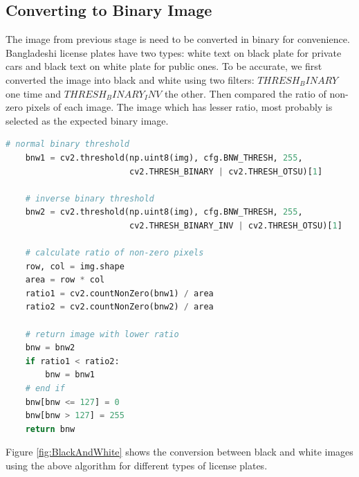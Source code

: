 \documentclass{standalone}
\begin{document}
\subsection{Converting to Binary Image}
The image from previous stage is need to be converted in binary for convenience. Bangladeshi license plates have two types: white text on black plate for private cars and black text on white plate for public ones. To be accurate, we first converted the image into black and white using two filters: $THRESH_BINARY$ one time and $THRESH_BINARY_INV$ the other. Then compared the ratio of non-zero pixels of each image. The image which has lesser ratio, most probably is selected as the expected binary image. 
\begin{lstlisting}[language=Python]
    # normal binary threshold
    bnw1 = cv2.threshold(np.uint8(img), cfg.BNW_THRESH, 255,
                         cv2.THRESH_BINARY | cv2.THRESH_OTSU)[1]

    # inverse binary threshold
    bnw2 = cv2.threshold(np.uint8(img), cfg.BNW_THRESH, 255,
                         cv2.THRESH_BINARY_INV | cv2.THRESH_OTSU)[1]

    # calculate ratio of non-zero pixels
    row, col = img.shape
    area = row * col
    ratio1 = cv2.countNonZero(bnw1) / area
    ratio2 = cv2.countNonZero(bnw2) / area

    # return image with lower ratio
    bnw = bnw2
    if ratio1 < ratio2:
        bnw = bnw1
    # end if
    bnw[bnw <= 127] = 0
    bnw[bnw > 127] = 255
    return bnw
\end{lstlisting}

Figure \ref{fig:BlackAndWhite} shows the conversion between black and white images using the above algorithm for different types of license plates.
\end{document}

